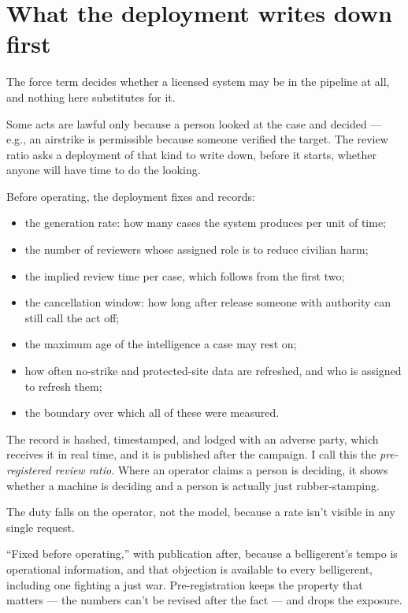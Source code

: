 \section{What the deployment writes down first}
\label{sec:7.1}
The force term decides whether a licensed system may be in the pipeline at all, and nothing here substitutes for it.

Some acts are lawful only because a person looked at the case and decided — e.g., an airstrike is permissible because someone verified the target. The review ratio asks a deployment of that kind to write down, before it starts, whether anyone will have time to do the looking.

Before operating, the deployment fixes and records:

\begin{itemize}
\item the generation rate: how many cases the system produces per unit of time;
\item the number of reviewers whose assigned role is to reduce civilian harm;
\item the implied review time per case, which follows from the first two;
\item the cancellation window: how long after release someone with authority can still call the act off;
\item the maximum age of the intelligence a case may rest on;
\item how often no-strike and protected-site data are refreshed, and who is assigned to refresh them;
\item the boundary over which all of these were measured.
\end{itemize}

The record is hashed, timestamped, and lodged with an adverse party, which receives it in real time, and it is published after the campaign. I call this the \emph{pre-registered review ratio}. Where an operator claims a person is deciding, it shows whether a machine is deciding and a person is actually just rubber-stamping.

The duty falls on the operator, not the model, because a rate isn't visible in any single request.

“Fixed before operating,” with publication after, because a belligerent's tempo is operational information, and that objection is available to every belligerent, including one fighting a just war. Pre-registration keeps the property that matters — the numbers can't be revised after the fact — and drops the exposure.

